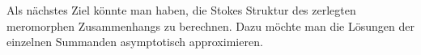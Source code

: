 \begin{comment}
Es wurde gezeigt...
\end{comment}

\begin{comment}
Stokes Struktur ausrechen? Dazu die Lösung asymptotisch approximieren
$\rightsquigarrow$ offensichtlich schwer\\
deshalb suche andere Lösung
\end{comment}
Als nächstes Ziel könnte man haben, die Stokes Struktur des zerlegten
meromorphen Zusammenhangs zu berechnen.
Dazu möchte man die Lösungen der einzelnen Summanden asymptotisch
approximieren. 


